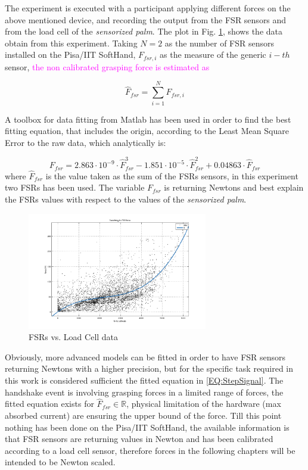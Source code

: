 The experiment is executed with a participant applying different forces on the above mentioned device, and recording the output from the FSR sensors and from the load cell of the \textit{sensorized palm}.
The plot in Fig. \ref{Fig:FSRcalibratedModel}, shows the data obtain from this experiment.
Taking $N=2$ as the number of FSR sensors installed on the Pisa/IIT SoftHand, $F_{fsr,i}$ as the measure of the generic $i-th$ sensor, \textcolor{magenta}{the non calibrated grasping force is estimated as} %

\begin{equation}
\hat{F}_{fsr} = \sum_{i=1}^{N} F_{fsr,i}
\label{EQ:sumofFSR}
\end{equation}

A toolbox for data fitting from Matlab has been used in order to find the best fitting equation, that includes the origin, according to the Least Mean Square Error to the raw data, which analytically is:

\begin{equation}
F_{fsr} = 2.863 \cdot 10^{-9}\cdot \hat{F}_{fsr}^3 - 1.851 \cdot 10^{-5} \cdot \hat{F}_{fsr}^2 + 0.04863 \cdot \hat{F}_{fsr} 
\label{EQ:fsrdummyfit}
\end{equation}
where $\hat{F}_{fsr}$ is the value taken as the sum of the FSRs sensors, in this experiment two FSRs has been used.
The variable $F_{fsr}$ is returning Newtons and best explain the FSRs values with respect to the values of the \textit{sensorized palm}.

 
\begin{figure}[h]
\centering
\includegraphics[width=0.7\textwidth]{Figure/fsrtodummy.png}
\caption{FSRs vs. Load Cell data}
\label{Fig:FSRcalibratedModel}
\end{figure}

Obviously, more advanced models can be fitted in order to have FSR sensors returning Newtons with a higher precision, but for the specific task required in this work is considered sufficient the fitted equation in \ref{EQ:StepSignal}. The handshake event is involving grasping forces in a limited range of forces, the fitted equation exists for $ \hat{F}_{fsr} \in \mathbb{R}$, physical limitation of the hardware (max absorbed current) are ensuring the upper bound of the force. Till this point nothing has been done on the Pisa/IIT SoftHand, the available information is that FSR sensors are returning values in Newton and has been calibrated according to a load cell sensor, therefore forces in the following chapters will be intended to be Newton scaled. 

